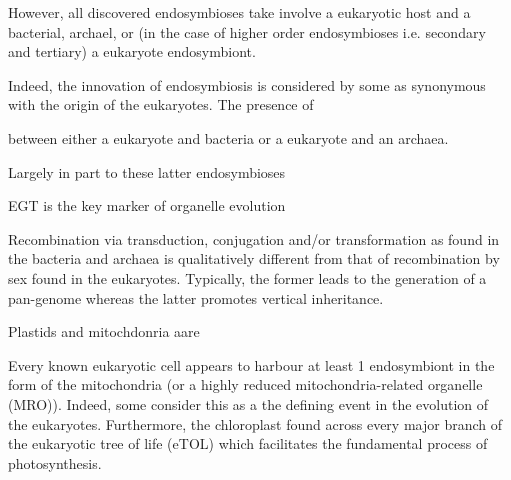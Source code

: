 However, all discovered endosymbioses take involve a eukaryotic host and a bacterial, archael, or (in the case of
higher order endosymbioses i.e. secondary and tertiary) a eukaryote endosymbiont. 

Indeed, the innovation of endosymbiosis is considered by some as synonymous with the origin of the eukaryotes.
The presence of 





between either a eukaryote and bacteria or a eukaryote and an archaea.






Largely in part to these latter endosymbioses 



EGT is the key marker of organelle evolution




Recombination via transduction, conjugation and/or transformation as found in the bacteria and archaea is
qualitatively different from that of recombination by sex found in the eukaryotes. 
Typically, the former leads to the generation of a pan-genome whereas the latter promotes vertical inheritance.








Plastids and mitochdonria aare 



Every known eukaryotic cell appears to harbour at least 1 endosymbiont in the form of the mitochondria (or a highly
reduced mitochondria-related organelle (MRO)). Indeed, some consider this as a the defining event in the 
evolution of the eukaryotes.  Furthermore, the chloroplast found across every major branch of the eukaryotic tree of life (eTOL)
which facilitates the fundamental process of photosynthesis.







